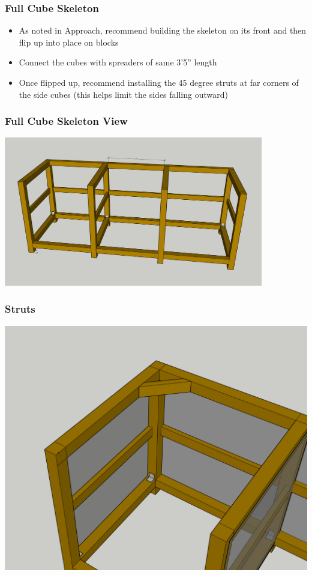 \documentclass{beamer}
\begin{document}
\begin{frame}
  \frametitle{Full Cube Skeleton}
  \begin{itemize}
  \item As noted in Approach, recommend building the skeleton on its front and then flip up into place on blocks
  \item Connect the cubes with spreaders of same 3'5'' length
    \item Once flipped up, recommend installing the 45 degree struts at far corners of the side cubes (this helps limit the sides falling outward)
  \end{itemize}
\end{frame}

\begin{frame}
  \frametitle{Full Cube Skeleton View}
  \begin{center}
\includegraphics[width=0.85\textwidth]{images/FullCubes.png}
  \end{center}
\end{frame}

\begin{frame}
  \frametitle{Struts}
 \begin{center}
\includegraphics[width=.7\textwidth]{images/Struts.PNG}
 \end{center} 
\end{frame}
\end{document}
